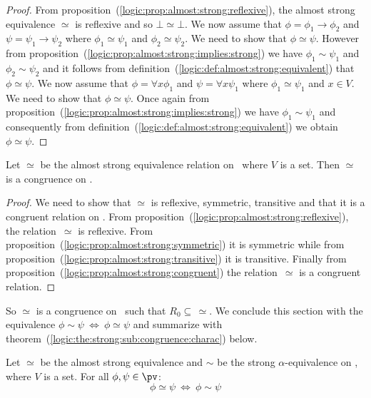 \noindent
\begin{proof}
From proposition~(\ref{logic:prop:almost:strong:reflexive}), the
almost strong equivalence $\simeq$ is reflexive and so
$\bot\simeq\bot$. We now assume that $\phi=\phi_{1}\to\phi_{2}$ and
$\psi=\psi_{1}\to\psi_{2}$ where $\phi_{1}\simeq\psi_{1}$ and
$\phi_{2}\simeq\psi_{2}$. We need to show that $\phi\simeq\psi$.
However from
proposition~(\ref{logic:prop:almost:strong:implies:strong}) we have
$\phi_{1}\sim\psi_{1}$ and $\phi_{2}\sim\psi_{2}$ and it follows
from definition~(\ref{logic:def:almost:strong:equivalent}) that
$\phi\simeq\psi$. We now assume that $\phi=\forall x\phi_{1}$ and
$\psi=\forall x\psi_{1}$ where $\phi_{1}\simeq\psi_{1}$ and $x\in
V$. We need to show that $\phi\simeq\psi$. Once again from
proposition~(\ref{logic:prop:almost:strong:implies:strong}) we have
$\phi_{1}\sim\psi_{1}$ and consequently from
definition~(\ref{logic:def:almost:strong:equivalent}) we obtain
$\phi\simeq\psi$.
\end{proof}


\begin{prop}\label{logic:prop:almost:strong:congruence}
Let $\simeq$ be the almost strong equivalence relation on \pv\ where
$V$ is a set. Then $\simeq$ is a congruence on \pv.
\end{prop}

\noindent
\begin{proof}
We need to show that $\simeq$ is reflexive, symmetric, transitive
and that it is a congruent relation on \pv. From
proposition~(\ref{logic:prop:almost:strong:reflexive}), the
relation~$\simeq$ is reflexive. From
proposition~(\ref{logic:prop:almost:strong:symmetric}) it is
symmetric while from
proposition~(\ref{logic:prop:almost:strong:transitive}) it is
transitive. Finally from
proposition~(\ref{logic:prop:almost:strong:congruent}) the
relation~$\simeq$ is a congruent relation.
\end{proof}

So $\simeq$ is a congruence on \pv\ such that
$R_{0}\subseteq\,\simeq$. We conclude this section with the
equivalence $\phi\sim\psi\ \Leftrightarrow\ \phi\simeq\psi$ and
summarize with
theorem~(\ref{logic:the:strong:sub:congruence:charac}) below.

\begin{prop}\label{logic:prop:almost:strong:is:strong}
Let $\simeq$ be the almost strong equivalence and $\sim$ be the
strong $\alpha$-equivalence on \pv, where $V$ is a set. For all
$\phi,\psi\in\pv$:
    \[
    \phi\simeq\psi\ \Leftrightarrow\ \phi\sim\psi
    \]
\end{prop}


